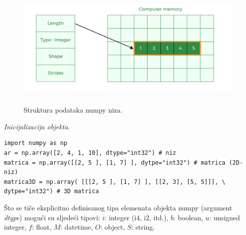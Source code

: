 \begin{figure}%
	\centering
	\includegraphics[width=320pt,height=170pt]{slike/numpy-array-memory.png} %

	\caption{Struktura podataka numpy niza.\protect \footnotemark}	 \label{fig:numpy_array}
 
\end{figure} 

\textit{Inicijalizacija objekta}. 
\begin{verbatim}
import numpy as np
ar = np.array([2, 4, 1, 10], dtype="int32") # niz
matrica = np.array([[2, 5 ], [1, 7] ], dytpe="int32") # matrica (2D-niz)
matrica3D = np.array( [[[2, 5 ], [1, 7] ], [[2, 3], [5, 5]]], \ 
dytpe="int32") # 3D matrica
\end{verbatim}
 
Što se tiče eksplicitno definisanog tipa elemenata objekta numpy (argument \emph{dtype}) mogući su sljedeći tipovi:  $i$: integer (i4, i2, itd.),  $b$: boolean, $u$: unsigned integer, $f$: float,  $M$: datetime, $O$: object, $S$: string. 

